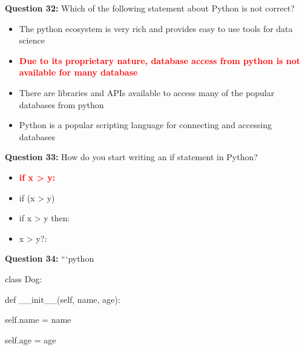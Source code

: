 \documentclass[12pt,a4paper]{article}
\begin{document}
\vspace{0.5cm}

\textbf{Question 32:} Which of the following statement about Python is not correct?

\begin{itemize}
    \item[\textbf{A.}] The python ecosystem is very rich and provides easy to use tools for data science
    \item[\textbf{B.}] \textcolor{red}{\textbf{Due to its proprietary nature, database access from python is not available for many database}}
    \item[\textbf{C.}] There are libraries and APIs available to access many of the popular databases from python
    \item[\textbf{D.}] Python is a popular scripting language for connecting and accessing databases
\end{itemize}

\vspace{0.5cm}

\textbf{Question 33:} How do you start writing an if statement in Python?

\begin{itemize}
    \item[\textbf{A.}] \textcolor{red}{\textbf{if x > y:}}
    \item[\textbf{B.}] if (x > y)
    \item[\textbf{C.}] if x > y then:
    \item[\textbf{D.}] x > y?:
\end{itemize}

\vspace{0.5cm}

\textbf{Question 34:} ```python\newline

\newline
class Dog:\newline

\newline
    def __init__(self, name, age):\newline

\newline
        self.name = name\newline

\newline
        self.age = age\newline

\newline
\newline
\end{document}
